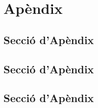 \documentclass[10pt,a4paper,twocolumn,twoside]{article}
\begin{document}
\appendix

\section*{Apèndix}

\setcounter{section}{1}

\subsection{Secció d'Apèndix}
\subsection{Secció d'Apèndix}
\subsection{Secció d'Apèndix}
\end{document}
